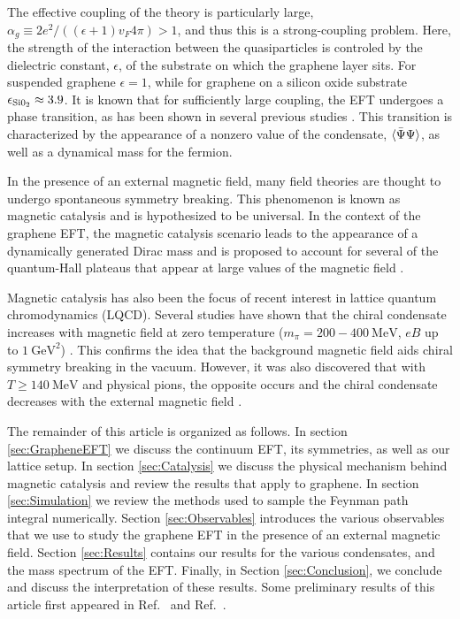 \documentclass[aps,prd,twocolumn,showpacs,superscriptaddress,groupedaddress]{revtex4}  %
\begin{document}
The effective coupling of the theory is particularly large, $\alpha_g \equiv 2e^2/((\epsilon+1) v_F 4\pi) > 1$, and thus this is a strong-coupling problem. Here, the strength of the interaction between the quasiparticles is controled by the dielectric constant, $\epsilon$, of the substrate on which the graphene layer sits. For suspended graphene $\epsilon = 1$, while for graphene on a silicon oxide substrate $\epsilon_{\rm Si0_2} \approx 3.9$. It is known that for sufficiently large coupling, the EFT undergoes a phase transition, as has been shown in 
several previous studies \cite{Drut1, Drut2, Hands1, Hands2}. This transition is characterized by the appearance of a nonzero value of the condensate, ${\langle {\bar \Psi} \Psi \rangle}$, as well as a dynamical mass
for the fermion.

In the presence of an external magnetic field, many field theories are thought to undergo spontaneous symmetry breaking. This phenomenon is known as magnetic catalysis and is hypothesized to be universal. In the context of the graphene EFT, the magnetic
catalysis scenario leads to the appearance of a dynamically generated Dirac mass and is proposed to account for several of the quantum-Hall plateaus that appear at large values of the magnetic field \cite{ZhangQHE,JiangQHE, Kennett}.

Magnetic catalysis has also been the focus of recent interest in lattice quantum chromodynamics (LQCD). Several studies have shown that the chiral condensate increases with magnetic field at zero temperature ($m_{\pi} = 200-400 ~\text{MeV}$, $eB$ up to $1 ~\text{GeV}^2$) \cite{Buividovich,Braguta,Cohen}. This confirms the idea that the background magnetic field aids chiral symmetry breaking in the vacuum.
However, it was also discovered that with $T \geq 140 ~\text{MeV}$ and physical pions, the opposite occurs and the chiral condensate decreases with the external magnetic field \cite{Bali1,Bali2}.

The remainder of this article is organized as follows. In section \ref{sec:GrapheneEFT} we discuss the continuum EFT, its symmetries, as well as our lattice setup.
In section \ref{sec:Catalysis} we discuss the physical mechanism behind magnetic catalysis and review the results that apply to graphene. In section \ref{sec:Simulation} we review the methods used to sample the Feynman path integral numerically. Section \ref{sec:Observables} introduces the various observables that we use to study the graphene EFT in the presence of an external magnetic field. Section \ref{sec:Results} contains our results for the various condensates, and the mass spectrum of the EFT.
Finally, in Section \ref{sec:Conclusion}, we conclude and discuss the interpretation of these results. Some preliminary results of this article first appeared in Ref.~\cite{DPF2015} and Ref.~\cite{GrapheneLetter}.
\end{document}
